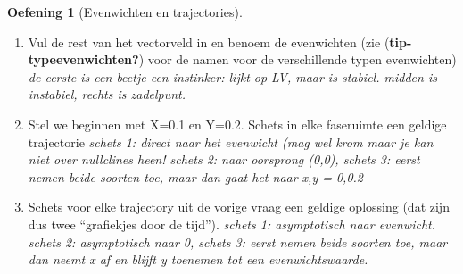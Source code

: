 \documentclass[
  a4paper,
]{scrbook}
\providecommand{\tightlist}{%
  \setlength{\itemsep}{0pt}\setlength{\parskip}{0pt}}\usepackage{longtable,booktabs,array}
\theoremstyle{definition}
\newtheorem{exercise}{Oefening}[chapter]
\theoremstyle{remark}
\begin{document}
\begin{exercise}[Evenwichten en
trajectories]
\begin{enumerate}
\def\labelenumi{\alph{enumi}.}
\tightlist
\item
  Vul de rest van het vectorveld in en benoem de evenwichten (zie
  (\textbf{tip-typeevenwichten?}) voor de namen voor de verschillende
  typen evenwichten) \emph{de eerste is een beetje een instinker: lijkt
  op LV, maar is stabiel. midden is instabiel, rechts is zadelpunt.}
\item
  Stel we beginnen met X=0.1 en Y=0.2. Schets in elke faseruimte een
  geldige trajectorie \emph{schets 1: direct naar het evenwicht (mag wel
  krom maar je kan niet over nullclines heen! schets 2: naar oorsprong
  (0,0), schets 3: eerst nemen beide soorten toe, maar dan gaat het naar
  x,y = 0,0.2 }
\item
  Schets voor elke trajectory uit de vorige vraag een geldige oplossing
  (dat zijn dus twee ``grafiekjes door de tijd''). \emph{schets 1:
  asymptotisch naar evenwicht. schets 2: asymptotisch naar 0, schets 3:
  eerst nemen beide soorten toe, maar dan neemt x af en blijft y
  toenemen tot een evenwichtswaarde.}
\end{enumerate}

\end{exercise}
\end{document}
